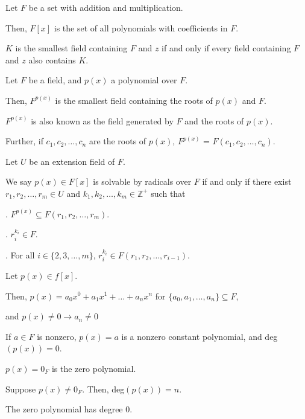 \documentclass{article}
\newcommand{\Z}{\mathbb Z}
\begin{document}
    
    Let $F$ be a set with addition and multiplication.
    
    Then, $F[x]$ is the set of all polynomials with coefficients in $F$.
    

    $K$ is the smallest field containing $F$ and $z$ if and only if every field containing $F$ and $z$ also contains $K$.


    Let $F$ be a field, and $p(x)$ a polynomial over $F$.

    Then, $F^{p(x)}$ is the smallest field containing the roots of $p(x)$ and $F$.

    $F^{p(x)}$ is also known as the field generated by $F$ and the roots of $p(x)$.

    Further, if $c_1, c_2, \hdots, c_n$ are the roots of $p(x)$, $F^{p(x)}$ = $F(c_1, c_2, \hdots, c_n)$.
    

    Let $U$ be an extension field of $F$.
    
    We say $p(x) \in F[x]$ is solvable by radicals over $F$ if and only if there exist $r_1, r_2, \hdots, r_m \in U$ and $k_1, k_2, \hdots, k_m \in \Z^+$ such that
    
    \indent{}. $F^{p(x)} \subseteq F(r_1, r_2, \hdots, r_m)$.
    
    \indent{}. $r_i^{k_i}\in F$.
    
    \indent{}. For all $i \in \{2,3,\hdots,m\}$, $r_i^{k_i}\in F(r_1, r_2, \hdots, r_{i-1})$.


    Let $p(x) \in f[x]$.
    
    Then, $p(x)=a_0x^0 + a_1x^1 + \hdots + a_nx^n$ for $\{a_0, a_1, \hdots, a_n\} \subseteq F$,
    
    \noindent and $p(x)\neq0 \rightarrow a_n\neq0$

    If $a \in F$ is nonzero, $p(x)=a$ is a nonzero constant polynomial, and deg$(p(x))=0$.
    
    $p(x) = 0_F$ is the zero polynomial.
    
    Suppose $p(x)\neq0_F$. Then, deg$(p(x))=n$.
    
    The zero polynomial has degree 0. %
    
\end{document}
